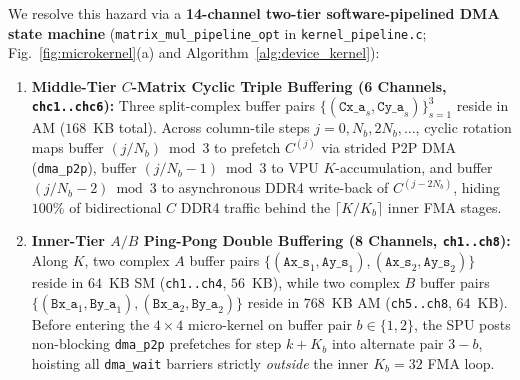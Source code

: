 \documentclass[conference]{IEEEtran}
\begin{document}
We resolve this hazard via a \textbf{14-channel two-tier software-pipelined DMA state machine} (\texttt{matrix\_mul\_pipeline\_opt} in \texttt{kernel\_pipeline.c}; Fig.~\ref{fig:microkernel}(a) and Algorithm~\ref{alg:device_kernel}):
\begin{enumerate}\setlength{\itemsep}{0.5pt}\setlength{\parskip}{0pt}
    \item \textbf{Middle-Tier $C$-Matrix Cyclic Triple Buffering (6 Channels, \texttt{chc1..chc6}):} Three split-complex buffer pairs $\{(\texttt{Cx\_a}_s, \texttt{Cy\_a}_s)\}_{s=1}^{3}$ reside in AM ($168$~KB total). Across column-tile steps $j = 0, N_b, 2N_b, \dots$, cyclic rotation maps buffer $(j/N_b) \bmod 3$ to prefetch $C^{(j)}$ via strided P2P DMA (\texttt{dma\_p2p}), buffer $(j/N_b - 1) \bmod 3$ to VPU $K$-accumulation, and buffer $(j/N_b - 2) \bmod 3$ to asynchronous DDR4 write-back of $C^{(j-2N_b)}$, hiding $100\%$ of bidirectional $C$ DDR4 traffic behind the $\lceil K / K_b \rceil$ inner FMA stages.
    \item \textbf{Inner-Tier $A/B$ Ping-Pong Double Buffering (8 Channels, \texttt{ch1..ch8}):} Along $K$, two complex $A$ buffer pairs $\{(\texttt{Ax\_s}_1, \texttt{Ay\_s}_1), (\texttt{Ax\_s}_2, \texttt{Ay\_s}_2)\}$ reside in $64$~KB SM (\texttt{ch1..ch4}, $56$~KB), while two complex $B$ buffer pairs $\{(\texttt{Bx\_a}_1, \texttt{By\_a}_1), (\texttt{Bx\_a}_2, \texttt{By\_a}_2)\}$ reside in $768$~KB AM (\texttt{ch5..ch8}, $64$~KB). Before entering the $4 \times 4$ micro-kernel on buffer pair $b \in \{1, 2\}$, the SPU posts non-blocking \texttt{dma\_p2p} prefetches for step $k + K_b$ into alternate pair $3 - b$, hoisting all \texttt{dma\_wait} barriers strictly \emph{outside} the inner $K_b=32$ FMA loop.
\end{enumerate}
\end{document}
